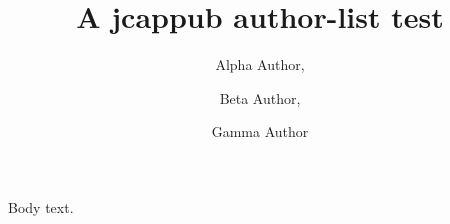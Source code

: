 \documentclass[a4paper,11pt]{article}
\title{A jcappub author-list test}
\author[1]{Alpha Author,}
\author[1,2]{Beta Author,}
\author[2]{Gamma Author}
\affiliation[1]{Institute One, City, Country}
\affiliation[2]{Institute Two, City, Country}
\begin{document}
\maketitle
Body text.
\end{document}
